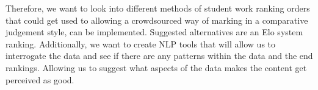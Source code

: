 		Therefore, we want to look into different methods of student work ranking orders that could get used to allowing a crowdsourced way of marking in a comparative judgement style, can be implemented. Suggested alternatives are an Elo system ranking. Additionally, we want to create NLP tools that will allow us to interrogate the data and see if there are any patterns within the data and the end rankings. Allowing us to suggest what aspects of the data makes the content get perceived as good.
